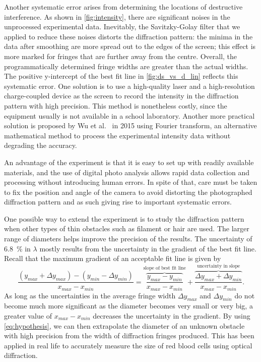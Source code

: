 \documentclass[a4paper, 12pt]{article}
\begin{document}
Another systematic error arises from determining the locations of destructive interference. 
As shown in \cref{fig:intensity}, there are significant noises in the unprocessed experimental data. 
Inevitably, the Savitzky-Golay filter that we applied to reduce these noises distorts the diffraction pattern: 
the minima in the data after smoothing are more spread out to the edges of the screen; 
this effect is more marked for fringes that are further away from the centre. 
Overall, the programmatically determined fringe widths are greater than the actual widths. 
The positive y-intercept of the best fit line in \cref{fig:ds_vs_d_lin} reflects this systematic error. 
One solution is to use a high-quality laser and a high-resolution charge-coupled device as the screen to record the intensity in the diffraction pattern with high precision. 
This method is nonetheless costly, since the equipment usually is not available in a school laboratory. 
Another more practical solution is proposed by Wu et al.\ \autocite{fourier} in 2015 using Fourier transform, an alternative mathematical method to process the experimental intensity data without degrading the accuracy.

An advantage of the experiment is that it is easy to set up with readily available materials, and the use of digital photo analysis allows rapid data collection and processing without introducing human errors. 
In spite of that, care must be taken to fix the position and angle of the camera to avoid distorting the photographed diffraction pattern and as such giving rise to important systematic errors.

One possible way to extend the experiment is to study the diffraction pattern when other types of thin obstacles such as filament or hair are used. 
The larger range of diameters helps improve the precision of the results.
The uncertainty of \SI{6.8}{\%} in $\lambda$ mostly results from the uncertainty in the gradient of the best fit line. 
Recall that the maximum gradient of an acceptable fit line is given by
\[ \frac{(y_{max} + \Delta y_{max}) - (y_{min} - \Delta y_{min})}{ x_{max} - x_{min} } 
= 
\overbrace{\frac{y_{max} - y_{min}}{x_{max} - x_{min}}}^{\text{slope of best fit line}} + \overbrace{\frac{\Delta y_{max} + \Delta y_{min} }{x_{max} - x_{min}}}^{\text{uncertainty in slope}}. \]
As long as the uncertainties in the average fringe width $\Delta y_{max}$ and $\Delta y_{min}$ do not become much more significant as the diameter becomes very small or very big, a greater value of $x_{max} - x_{min}$ decreases the uncertainty in the gradient. 
By using \cref{eq:hypothesis}, we can then extrapolate the diameter of an unknown obstacle with high precision from the width of diffraction fringes produced. 
This has been applied in real life to accurately measure the size of red blood cells using optical diffraction. \autocite{blood_cell_success}

\printbibliography
\end{document}
